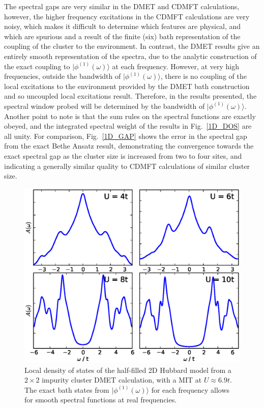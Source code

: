 \documentclass[aps,twocolumn,nobibnotes]{revtex4}
\begin{document}
The spectral gaps are very similar in the DMET and CDMFT calculations, however, the higher frequency excitations in the CDMFT calculations are very noisy, which makes it difficult to determine 
which features are physical, and which are spurious and a result of the finite (six) bath representation of the coupling of the cluster to the environment. In contrast, the DMET results give an entirely smooth
representation of the spectra, due to the analytic construction of the exact coupling to $|\phi^{(1)}(\omega)\rangle$ at each frequency. However, 
at very high frequencies, outside the bandwidth of $|\phi^{(1)}(\omega)\rangle$, there is no coupling of the local excitations to the 
environment provided by the DMET bath construction and so uncoupled local excitations result. 
Therefore, in the results presented, the spectral window probed will be determined by the bandwidth of $|\phi^{(1)}(\omega)\rangle$. Another point to note is that the sum rules on the spectral functions are
exactly obeyed, and the integrated spectral weight of the results in Fig.~\ref{1D_DOS} are all unity.
For comparison, Fig.~\ref{1D_GAP} shows the error in the spectral gap from the exact Bethe Ansatz result\cite{Ovchinni1970}, demonstrating 
the convergence towards the exact spectral gap as the cluster size is increased 
from two to four sites, and indicating a generally similar quality to CDMFT calculations of similar cluster size.

\begin{figure}
\begin{center}
    \vspace{-2mm}
\includegraphics[scale=0.425]{Plots/2D_Spectra/2DHub_Spectra.eps}
\end{center}
    \vspace{-8mm}
\caption{Local density of states of the half-filled 2D Hubbard model from a $2 \times 2$ impurity cluster DMET calculation, with a 
MIT at $U\approx6.9t$. 
The exact bath states from $|\phi^{(1)}(\omega)\rangle$ for each frequency allows for smooth spectral functions at real frequencies.}
\label{2D_DOS}
\end{figure}
\end{document}
